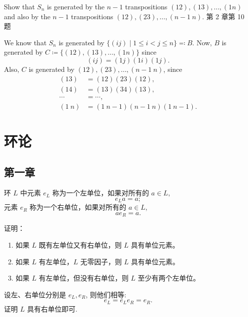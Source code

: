 \setcounter{pb}{18}
\begin{problem}
    Show that $ S_n $ is generated by the $ n-1 $ transpositions $ (12), (13), \dots, (1n) $ and also by 
    the $ n-1 $ transpositions $ (12), (23), \dots, (n-1\ n) $. 第 2 章第 10 题
\end{problem}

\begin{solution}
    We know that $S_{n}$ is generated by $\{(i j)\mid 1\leq i<j\leq n\}\eqqcolon B$. 
    Now, $B$ is generated by $C \coloneqq \{(12), (13), \dots, (1n)\}$ since
        \[
            (i j)=(1 j)(1 i)(1 j).
        \]
    Also, $C$ is generated by $ (12), (23), \dots, (n-1\ n) $, since
        \[
            \begin{split}
                (1 3) &=(1 2)(2 3)(1 2), \\
                (1 4) &=(1 3)(3 4)(1 3),\\
                \cdots &= \cdots, \\
                (1\ n) &=(1\ n-1)(n-1\ n)(1\ n-1).
            \end{split}
        \]
\end{solution}

\section{环论}
\subsection{第一章}
\setcounter{pb}{31}
\begin{problem}
环 $L$ 中元素 $e_L$ 称为一个左单位，如果对所有的 $a \in L$, 
\[
e_L a = a;
\]
元素 $e_R$ 称为一个右单位，如果对所有的 $a \in L$, 
\[
a e_R = a.
\]

证明：
\begin{enumerate}[label=(\roman*)]
    \item 如果 $L$ 既有左单位又有右单位，则 $L$ 具有单位元素。
    \item 如果 $L$ 有左单位，$L$ 无零因子，则 $L$ 具有单位元素。
    \item 如果 $L$ 有左单位，但没有右单位，则 $L$ 至少有两个左单位。
\end{enumerate}
\end{problem}

\begin{vain}
    设左、右单位分别是 $e_{L}, e_{R}$, 则他们相等: 
        \[
            e_{L}=e_{L} e_{R}=e_{R}.
        \]
    证明 $L$ 具有右单位即可.
\end{vain}

